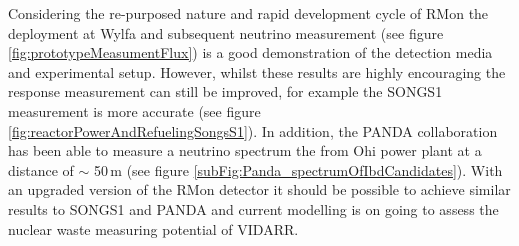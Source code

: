 Considering the re-purposed nature and rapid development cycle of RMon the deployment at Wylfa and subsequent neutrino measurement (see figure \ref{fig:prototypeMeasumentFlux}) is a good demonstration of the detection media and experimental setup. However, whilst these results are highly encouraging the response measurement can still be improved, for example the SONGS1 measurement is more accurate (see figure \ref{fig:reactorPowerAndRefuelingSongsS1}). In addition, the PANDA collaboration has been able to measure a neutrino spectrum the from Ohi power plant at a distance of $\sim$ 50\,m \cite{IIRIE_Panda_2021} (see figure \ref{subFig:Panda_spectrumOfIbdCandidates}). With an upgraded version of the RMon detector it should be possible to achieve similar results to SONGS1 and PANDA and current modelling is on going to assess the nuclear waste measuring potential of VIDARR. 

